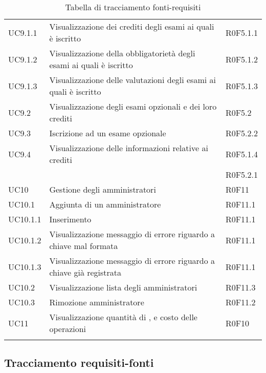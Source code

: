 \documentclass[AnalisiDeiRequisiti.tex]{subfiles}
\begin{document}
\begin{longtable}[H]{p{2cm}p{5cm}p{5cm}}
	UC9.1.1 & Visualizzazione dei crediti degli esami ai quali è iscritto & R0F5.1.1 \\  
	UC9.1.2 & Visualizzazione della obbligatorietà degli esami ai quali è iscritto & R0F5.1.2 \\  
	UC9.1.3 & Visualizzazione delle valutazioni degli esami ai quali è iscritto	& R0F5.1.3 \\  
	UC9.2 & Visualizzazione degli esami opzionali e dei loro crediti & R0F5.2 \\  
	UC9.3 & Iscrizione ad un esame opzionale & R0F5.2.2 \\  
	UC9.4 & Visualizzazione delle informazioni relative ai crediti & R0F5.1.4 \\ 
	& & R0F5.2.1 \\  
	UC10 & Gestione degli amministratori & R0F11 \\  
	UC10.1 & Aggiunta di un amministratore & R0F11.1 \\  
	UC10.1.1 & Inserimento \citGloss{chiave pubblica} & R0F11.1 \\  
	UC10.1.2 & Visualizzazione messaggio di errore riguardo a chiave mal formata & R0F11.1 \\  
	UC10.1.3 & Visualizzazione messaggio di errore riguardo a chiave già registrata & R0F11.1 \\  
	UC10.2 & Visualizzazione lista degli amministratori & R0F11.3 \\  
	UC10.3 & Rimozione amministratore & R0F11.2 \\  
	UC11 & Visualizzazione quantità di \citGloss{Gas}, \citGloss{Ether} e costo delle operazioni & R0F10 \\  
	\hiderowcolors
	\caption{Tabella di tracciamento fonti-requisiti}
\end{longtable}

\subsection{Tracciamento requisiti-fonti}
\end{document}
